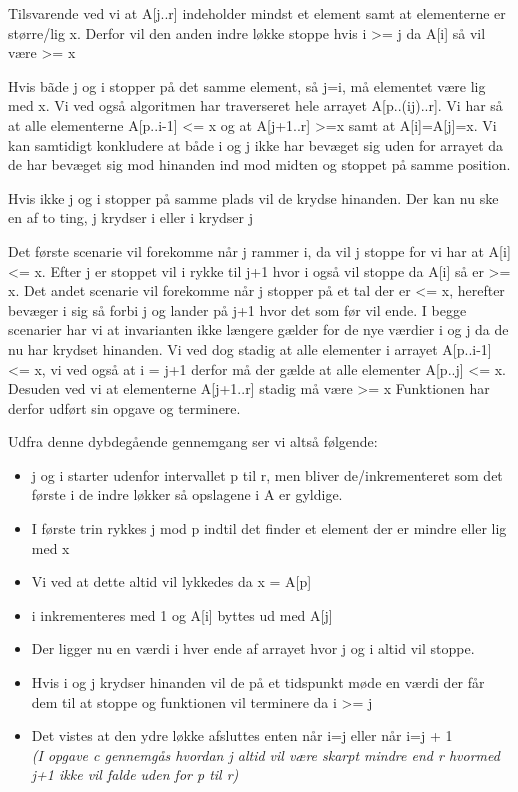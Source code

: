 \documentclass[10pt,a4paper,danish]{article}
\begin{document}
Tilsvarende ved vi at A[j..r] indeholder mindst et element samt at elementerne er større/lig x. Derfor vil den anden indre løkke stoppe hvis i >= j da A[i] så vil være >= x

Hvis bãde j og i stopper på det samme element, så j=i, må elementet være lig med x. Vi ved også algoritmen har traverseret hele arrayet A[p..(ij)..r]. Vi har så at alle elementerne A[p..i-1] <= x og at A[j+1..r] >=x samt at A[i]=A[j]=x.
Vi kan samtidigt konkludere at både i og j ikke har bevæget sig uden for arrayet da de har bevæget sig mod hinanden ind mod midten og stoppet på samme position.

Hvis ikke j og i stopper på samme plads vil de krydse hinanden.
Der kan nu ske en af to ting, j krydser i eller i krydser j

Det første scenarie vil forekomme når j rammer i, da vil j stoppe for vi har at A[i] <= x. Efter j er stoppet vil i rykke til j+1 hvor i også vil stoppe da A[i] så er >= x.
Det andet scenarie vil forekomme når j stopper på et tal der er <= x, herefter bevæger i sig så forbi j og lander på j+1 hvor det som før vil ende.
I begge scenarier har vi at invarianten ikke længere gælder for de nye værdier i og j da de nu har krydset hinanden. Vi ved dog stadig at alle elementer i arrayet A[p..i-1] <= x, vi ved også at i = j+1 derfor må der gælde at alle elementer A[p..j] <= x. Desuden ved vi at elementerne A[j+1..r] stadig må være >= x
Funktionen har derfor udført sin opgave og terminere. 

Udfra denne dybdegående gennemgang ser vi altså følgende:
\begin{itemize}
\item j og i starter udenfor intervallet p til r, men bliver de/inkrementeret som det første i de indre løkker så opslagene i A er gyldige.
\item I første trin rykkes j mod p indtil det finder et element der er mindre eller lig med x
\item Vi ved at dette altid vil lykkedes da x = A[p]
\item i inkrementeres med 1 og A[i] byttes ud med A[j]
\item Der ligger nu en værdi i hver ende af arrayet hvor j og i altid vil stoppe.
\item Hvis i og j krydser hinanden vil de på et tidspunkt møde en værdi der får dem til at stoppe og funktionen vil terminere da i >= j
\\

\item Det vistes at den ydre løkke afsluttes enten når i=j eller når i=j + 1\\
\textit{(I opgave c gennemgås hvordan j altid vil være skarpt mindre end r hvormed j+1 ikke vil falde uden for p til r)}
\end{itemize}
\end{document}
